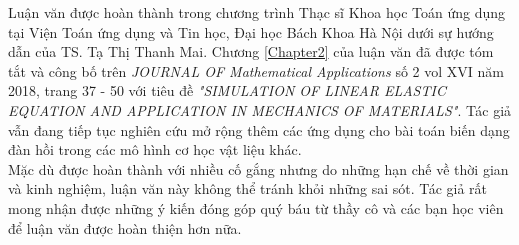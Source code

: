 Luận văn được hoàn thành trong chương trình Thạc sĩ Khoa học Toán ứng dụng tại Viện Toán ứng dụng và Tin học, Đại học Bách Khoa Hà Nội dưới sự hướng dẫn của TS. Tạ Thị Thanh Mai. Chương \ref{Chapter2} của luận văn đã được tóm tắt và công bố trên {\em JOURNAL OF Mathematical Applications} số 2 vol XVI năm 2018, trang 37 - 50 với tiêu đề \textit{"SIMULATION OF LINEAR ELASTIC EQUATION AND APPLICATION IN MECHANICS OF MATERIALS"}. Tác giả vẫn đang tiếp tục nghiên cứu mở rộng thêm các ứng dụng cho bài toán biến dạng đàn hồi trong các mô hình cơ học vật liệu khác.\\[-0.5cm]

Mặc dù được hoàn thành với nhiều cố gắng nhưng do những hạn chế về thời gian và kinh nghiệm, luận văn này không thể tránh khỏi những sai sót. Tác giả rất mong nhận được những ý kiến đóng góp quý báu từ thầy cô và các bạn học viên để luận văn được hoàn thiện hơn nữa.